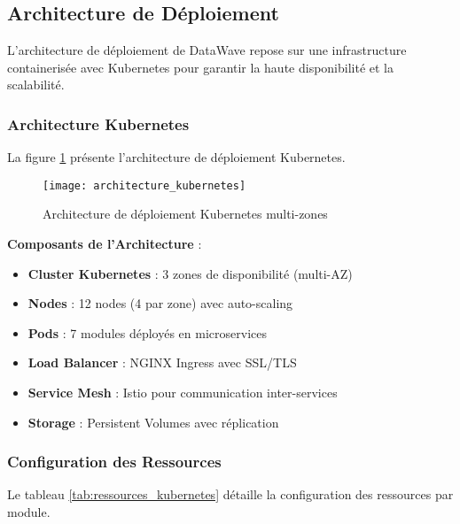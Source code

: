 \subsection{Architecture de Déploiement}

L'architecture de déploiement de DataWave repose sur une infrastructure containerisée avec Kubernetes pour garantir la haute disponibilité et la scalabilité.

\subsubsection{Architecture Kubernetes}

La figure \ref{fig:architecture_kubernetes} présente l'architecture de déploiement Kubernetes.

\begin{figure}[htpb]
\centering
\texttt{[image: architecture\_kubernetes]}
\caption{Architecture de déploiement Kubernetes multi-zones}
\label{fig:architecture_kubernetes}
\end{figure}

\textbf{Composants de l'Architecture} :
\begin{itemize}
    \item \textbf{Cluster Kubernetes} : 3 zones de disponibilité (multi-AZ)
    \item \textbf{Nodes} : 12 nodes (4 par zone) avec auto-scaling
    \item \textbf{Pods} : 7 modules déployés en microservices
    \item \textbf{Load Balancer} : NGINX Ingress avec SSL/TLS
    \item \textbf{Service Mesh} : Istio pour communication inter-services
    \item \textbf{Storage} : Persistent Volumes avec réplication
\end{itemize}

\subsubsection{Configuration des Ressources}

Le tableau \ref{tab:ressources_kubernetes} détaille la configuration des ressources par module.


